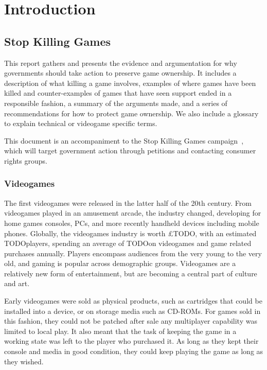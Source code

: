 \chapter{Introduction}

\section{Stop Killing Games}
This report gathers and presents the evidence and argumentation for why governments should take action to preserve game ownership.
It includes a description of what killing a game involves,
examples of where games have been killed and counter-examples of games that have seen support ended in a responsible fashion,
a summary of the arguments made,
and a series of recommendations for how to protect game ownership.
We also include a glossary to explain technical or videogame specific terms.

This document is an accompaniment to the Stop Killing Games campaign~\cite{stop-killing-games-2024},
which will target government action through petitions and contacting consumer rights groups.

\subsection{Videogames}
The first videogames were released in the latter half of the 20th century.
From videogames played in an amusement arcade, the industry changed, developing for home games consoles, PCs, and more recently handheld devices including mobile phones.
Globally, the videogames industry is worth £TODO\cn,
with an estimated TODO\cn players,
spending an average of TODO\cn on videogames and game related purchases annually.
Players encompass audiences from the very young to the very old, and gaming is popular across demographic groups\cn.
Videogames are a relatively new form of entertainment, but are becoming a central part of culture and art.

Early videogames were sold as physical products, such as cartridges that could be installed into a device, or on storage media such as CD-ROMs.
For games sold in this fashion, they could not be patched after sale any multiplayer capability was limited to local play.
It also meant that the task of keeping the game in a working state was left to the player who purchased it.
As long as they kept their console and media in good condition, they could keep playing the game as long as they wished.

